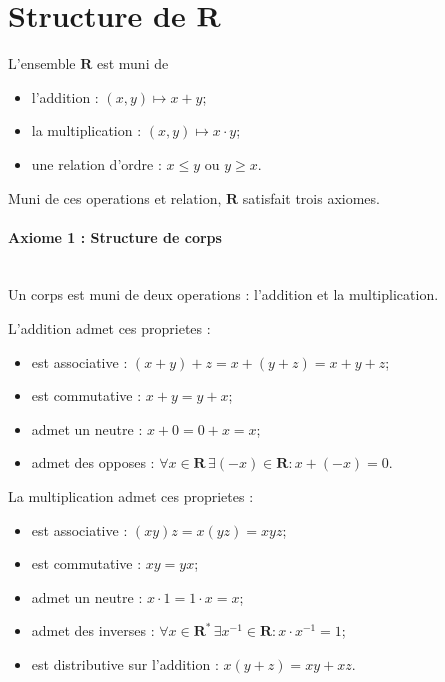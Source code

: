 \section{Structure de \texorpdfstring{$\mathbf{R}$}{R}}
L'ensemble $\mathbf{R}$ est muni de
\begin{itemize}
\item l'addition : $(x,y)\mapsto x+y$;
\item la multiplication : $(x,y)\mapsto x\cdot y$;
\item une relation d'ordre : $x\le y$ ou $y\ge x$.
\end{itemize}
Muni de ces operations et relation, $\mathbf{R}$ satisfait trois axiomes.
\paragraph{Axiome 1 : Structure de corps}~\\
Un corps est muni de deux operations : l'addition et la multiplication. 

L'addition admet ces proprietes :
\begin{itemize}
\item est associative : $(x+y)+z=x+(y+z)=x+y+z$;
\item est commutative : $x+y=y+x$;
\item admet un neutre : $x+0=0+x=x$;
\item admet des opposes : $\forall x \in \mathbf{R}\,\exists(-x)\in \mathbf{R}:x+(-x)=0$.
\end{itemize}

La multiplication admet ces proprietes :
\begin{itemize}
\item est associative : $(xy)z=x(yz)=xyz$;
\item est commutative : $xy=yx$;
\item admet un neutre : $x\cdot 1=1\cdot x=x$;
\item admet des inverses : $\forall x \in \mathbf{R}^{*}\,\exists x ^{-1}\in \mathbf{R}:x\cdot x^{-1}=1$;
\item est distributive sur l'addition : $x(y+z)=xy+xz$.
\end{itemize}

